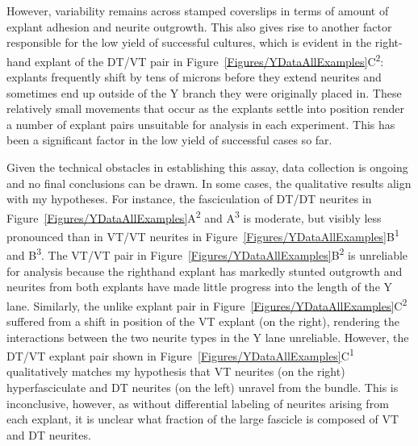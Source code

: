 However, variability remains across stamped coverslips in terms of amount of explant adhesion and neurite outgrowth.
This also gives rise to another factor responsible for the low yield of successful cultures, which is evident in the right-hand explant of the DT/VT pair in Figure~\ref{Figures/YDataAllExamples}C\textsuperscript{2}: explants frequently shift by tens of microns before they extend neurites and sometimes end up outside of the Y branch they were originally placed in.
These relatively small movements that occur as the explants settle into position render a number of explant pairs unsuitable for analysis in each experiment.
This has been a significant factor in the low yield of successful cases so far.

Given the technical obstacles in establishing this assay, data collection is ongoing and no final conclusions can be drawn.
In some cases, the qualitative results align with my hypotheses.
For instance, the fasciculation of DT/DT neurites in Figure~\ref{Figures/YDataAllExamples}A\textsuperscript{2} and A\textsuperscript{3} is moderate, but visibly less pronounced than in VT/VT neurites in Figure~\ref{Figures/YDataAllExamples}B\textsuperscript{1} and B\textsuperscript{3}.
The VT/VT pair in Figure~\ref{Figures/YDataAllExamples}B\textsuperscript{2} is unreliable for analysis because the righthand explant has markedly stunted outgrowth and neurites from both explants have made little progress into the length of the Y lane.
Similarly, the unlike explant pair in Figure~\ref{Figures/YDataAllExamples}C\textsuperscript{2} suffered from a shift in position of the VT explant (on the right), rendering the interactions between the two neurite types in the Y lane unreliable.
However, the DT/VT explant pair shown in Figure~\ref{Figures/YDataAllExamples}C\textsuperscript{1} qualitatively matches my hypothesis that VT neurites (on the right) hyperfasciculate and DT neurites (on the left) unravel from the bundle.
This is inconclusive, however, as without differential labeling of neurites arising from each explant, it is unclear what fraction of the large fascicle is composed of VT and DT neurites.

